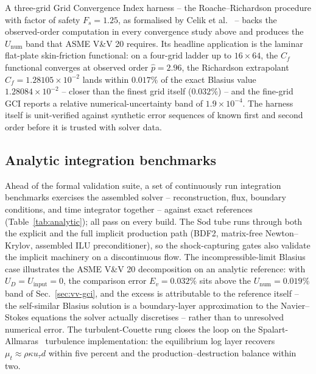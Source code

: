 \documentclass[journal,biblatex]{new-aiaa}
\begin{document}
A three-grid Grid Convergence Index harness -- the Roache--Richardson procedure with factor of safety $F_s=1.25$, as formalised by Celik et al.~\cite{celik_procedure_2008} -- backs the observed-order computation in every convergence study above and produces the $U_{\mathrm{num}}$ band that ASME V\&V 20 requires. Its headline application is the laminar flat-plate skin-friction functional: on a four-grid ladder up to $16\times64$, the $C_f$ functional converges at observed order $\hat p=2.96$, the Richardson extrapolant $C_f=1.28105\times10^{-2}$ lands within $0.017\%$ of the exact Blasius value $1.28084\times10^{-2}$ -- closer than the finest grid itself ($0.032\%$) -- and the fine-grid GCI reports a relative numerical-uncertainty band of $1.9\times10^{-4}$. The harness itself is unit-verified against synthetic error sequences of known first and second order before it is trusted with solver data.

\subsection{Analytic integration benchmarks}
\label{sec:vv-analytic}

Ahead of the formal validation suite, a set of continuously run integration benchmarks exercises the assembled solver -- reconstruction, flux, boundary conditions, and time integrator together -- against exact references (Table~\ref{tab:analytic}); all pass on every build. The Sod tube runs through both the explicit and the full implicit production path (BDF2, matrix-free Newton--Krylov, assembled ILU preconditioner), so the shock-capturing gates also validate the implicit machinery on a discontinuous flow. The incompressible-limit Blasius case illustrates the ASME V\&V 20 decomposition on an analytic reference: with $U_D=U_{\mathrm{input}}=0$, the comparison error $E_v=0.032\%$ sits above the $U_{\mathrm{num}}=0.019\%$ band of Sec.~\ref{sec:vv-gci}, and the excess is attributable to the reference itself -- the self-similar Blasius solution is a boundary-layer approximation to the Navier--Stokes equations the solver actually discretises -- rather than to unresolved numerical error. The turbulent-Couette rung closes the loop on the Spalart-Allmaras~\cite{spalart_one-equation_1992} turbulence implementation: the equilibrium log layer recovers $\mu_t\approx\rho\kappa u_\tau d$ within five percent and the production--destruction balance within two.
\end{document}
